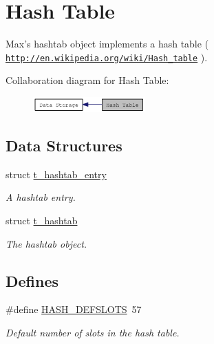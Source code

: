 \hypertarget{group__hashtab}{
\section{Hash Table}
\label{group__hashtab}
}


Max's hashtab object implements a hash table ( \href{http://en.wikipedia.org/wiki/Hash_table}{\tt http://en.wikipedia.org/wiki/Hash\_\-table} ).  


Collaboration diagram for Hash Table:\nopagebreak
\begin{figure}[H]
\begin{center}
\leavevmode
\includegraphics[width=122pt]{group__hashtab}
\end{center}
\end{figure}
\subsection*{Data Structures}
\begin{DoxyCompactItemize}
\item 
struct \hyperlink{structt__hashtab__entry}{t\_\-hashtab\_\-entry}
\begin{DoxyCompactList}\small\item\em A hashtab entry. \item\end{DoxyCompactList}\item 
struct \hyperlink{structt__hashtab}{t\_\-hashtab}
\begin{DoxyCompactList}\small\item\em The hashtab object. \item\end{DoxyCompactList}\end{DoxyCompactItemize}
\subsection*{Defines}
\begin{DoxyCompactItemize}
\item 
\#define \hyperlink{group__hashtab_ga160118a25646d04cce8c75f6f3eb9207}{HASH\_\-DEFSLOTS}~57
\begin{DoxyCompactList}\small\item\em Default number of slots in the hash table. \item\end{DoxyCompactList}\end{DoxyCompactItemize}
